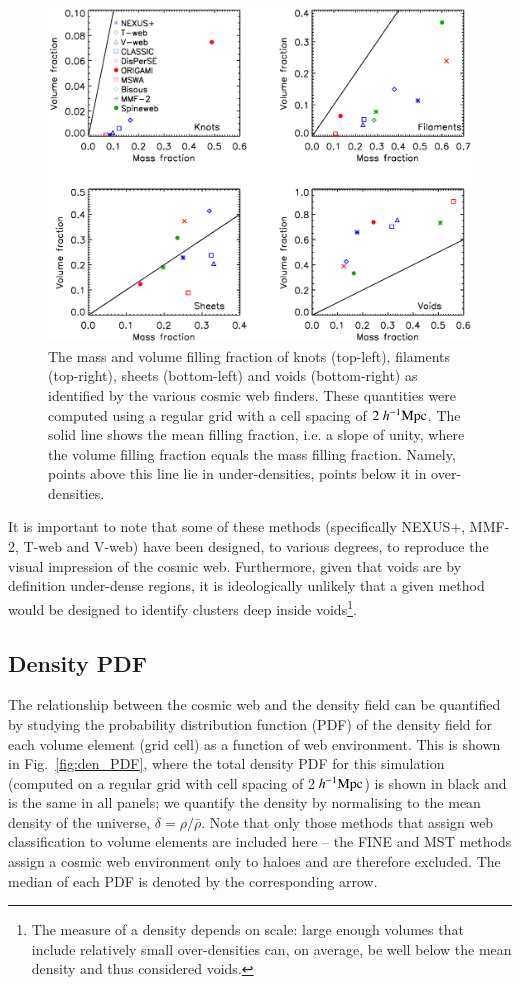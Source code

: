 \documentclass[useAMS,usenatbib]{mnras}
\def\hmpc{~h^{-1}\rm Mpc}
\newcommand{\fine}{\textsc{FINE}}
\newcommand{\mst}{\textsc{MST}}
\newcommand{\nexus}{\textsc{NEXUS+}}
\newcommand{\tweb}{T-web}
\newcommand{\vweb}{V-web}
\newcommand{\mmft}{\textsc{MMF-2}}
\begin{document}
\begin{figure}
 \includegraphics[width=\textwidth]{./FIGS/vff-mff}
 \vspace{-.7cm}
 \caption{ The mass and volume filling fraction of knots (top-left), filaments (top-right), sheets (bottom-left) and voids (bottom-right) as identified by the various cosmic web finders. These quantities were computed using a regular grid with a cell spacing of $2\hmpc$. The solid line shows the mean filling fraction, i.e. a slope of unity, where the volume filling fraction equals the mass filling fraction. Namely, points above this line lie in under-densities, points below it in over-densities. }
 \label{fig:vff_mff}
\end{figure}

It is important to note that some of these methods (specifically \nexus{}, \mmft{}, \tweb{} and \vweb{}) have been designed, to various degrees, to reproduce the visual impression of the cosmic web. Furthermore, given that voids are by definition under-dense regions, it is ideologically unlikely that a given method would be designed to identify clusters deep inside voids\footnote{The measure of a density depends on scale: large enough volumes that include relatively small over-densities can, on average, be well below the mean density and thus considered voids.}.

\subsection{Density PDF}
The relationship between the cosmic web and the density field can be quantified by studying the probability distribution function (PDF) of the density field for each volume element (grid cell) as a function of web environment. This is shown in Fig.~\ref{fig:den_PDF}, where the total density PDF for this simulation (computed on a regular grid with cell spacing of 2$\hmpc$) is shown in black and is the same in all panels; we quantify the density by normalising to the mean density of the universe, $\delta=\rho/\bar{\rho}$. Note that only those methods that assign web classification to volume elements are included here -- the \fine{} and \mst{} methods assign a cosmic web environment only to haloes and are therefore excluded. The median of each PDF is denoted by the corresponding arrow.
\end{document}

